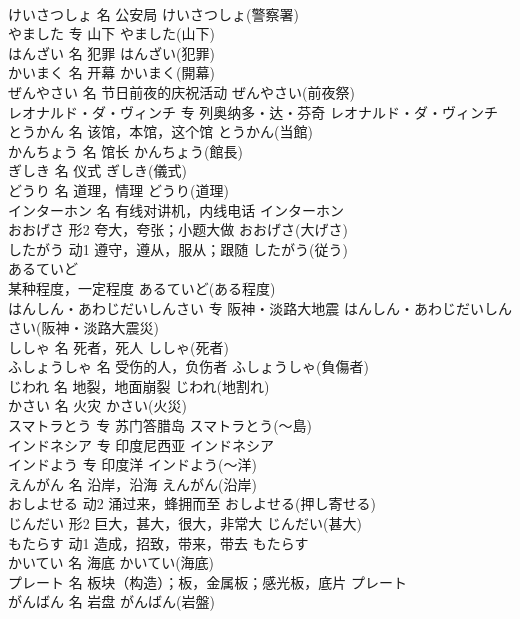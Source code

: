 \documentclass[8pt]{extreport}
\begin{document}
\begin{CJK}{UTF8}{min}
\\	けいさつしょ	名	公安局	けいさつしょ(警察署)	
\\	やました	专	山下	やました(山下)	
\\	はんざい	名	犯罪	はんざい(犯罪)	
\\	かいまく	名	开幕	かいまく(開幕)	
\\	ぜんやさい	名	节日前夜的庆祝活动	ぜんやさい(前夜祭)	
\\	レオナルド・ダ・ヴィンチ	专	列奥纳多・达・芬奇	レオナルド・ダ・ヴィンチ	
\\	とうかん	名	该馆，本馆，这个馆	とうかん(当館)	
\\	かんちょう	名	馆长	かんちょう(館長)	
\\	ぎしき	名	仪式	ぎしき(儀式)	
\\	どうり	名	道理，情理	どうり(道理)	
\\	インターホン	名	有线对讲机，内线电话	インターホン	
\\	おおげさ	形2	夸大，夸张；小题大做	おおげさ(大げさ)	
\\	したがう	动1	遵守，遵从，服从；跟随	したがう(従う)	
\\	あるていど	
\\	某种程度，一定程度	あるていど(ある程度)	
\\	はんしん・あわじだいしんさい	专	阪神・淡路大地震	はんしん・あわじだいしんさい(阪神・淡路大震災)	
\\	ししゃ	名	死者，死人	ししゃ(死者)	
\\	ふしょうしゃ	名	受伤的人，负伤者	ふしょうしゃ(負傷者)	
\\	じわれ	名	地裂，地面崩裂	じわれ(地割れ)	
\\	かさい	名	火灾	かさい(火災)	
\\	スマトラとう	专	苏门答腊岛	スマトラとう(～島)	
\\	インドネシア	专	印度尼西亚	インドネシア	
\\	インドよう	专	印度洋	インドよう(～洋)	
\\	えんがん	名	沿岸，沿海	えんがん(沿岸)	
\\	おしよせる	动2	涌过来，蜂拥而至	おしよせる(押し寄せる)	
\\	じんだい	形2	巨大，甚大，很大，非常大	じんだい(甚大)	
\\	もたらす	动1	造成，招致，带来，带去	もたらす	
\\	かいてい	名	海底	かいてい(海底)	
\\	プレート	名	板块（构造）；板，金属板；感光板，底片	プレート	
\\	がんばん	名	岩盘	がんばん(岩盤)	

\end{CJK}
\end{document}
